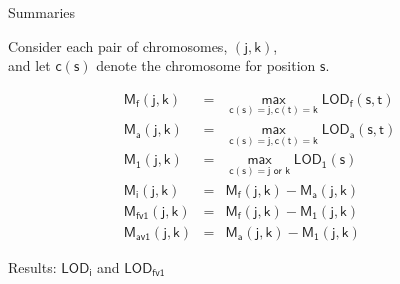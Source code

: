 \documentclass[aspectratio=169,12pt,t]{beamer}
\newcommand{\lod}{\text{LOD}}
\newcommand{\M}{\text{M}}
\begin{document}
\begin{frame}{Summaries}

\hfill \begin{minipage}[t]{10in}
Consider each pair of chromosomes, {\lolit $\mathsf{(j, k)}$}, \\
and let {\lolit $\mathsf{c(s)}$} denote the chromosome for
  position {\lolit $\mathsf{s}$}.

\bigskip
\footnotesize
\begin{minipage}{6in}
{\lolit
\begin{eqnarray*}
\mathsf{\M_f(j,k)}& = &\mathsf{ \max_{c(s)=j, c(t)=k} \lod_f(s,t)} \\
\mathsf{\M_a(j,k)}& = &\mathsf{ \max_{c(s)=j, c(t)=k} \lod_a(s,t)} \\
\mathsf{\M_1(j,k)}& = &\mathsf{ \max_{c(s)=j \text{ or } k} \lod_1(s)} \\[12pt]
\mathsf{\M_i(j,k)}& = &\mathsf{ \M_f(j,k) - \M_a(j,k)}\\
\mathsf{\M_{fv1}(j,k)}& = &\mathsf{ \M_f(j,k) - \M_1(j,k)}\\
\mathsf{\M_{av1}(j,k)}& = &\mathsf{ \M_a(j,k) - \M_1(j,k)}
\end{eqnarray*}
}
\end{minipage}
\end{minipage}

\end{frame}







\begin{frame}[c]{Results: $\mathsf{\lod_i}$ and $\mathsf{\lod_{fv1}}$}


\end{frame}
\end{document}
